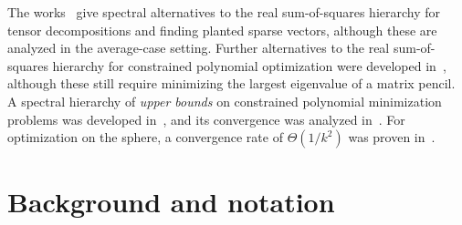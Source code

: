 \documentclass[11pt]{article}
\numberwithin{theorem}{section}
\theoremstyle{definition}
\newcommand{\ip}[2]{\langle #1 , #2\rangle}
\newcommand{\I}{\mathds{1}}
\newcommand{\complex}{\mathbb{C}}
\newcommand{\field}{\mathbb{F}}
\newcommand{\real}{\mathbb{R}}
\newcommand\V{\mathcal{V}}
\newcommand{\Vc}{\V_{\complex}}
\newcommand{\Vr}{\V_{\real}}
\begin{document}
The works~\cite{HopkinsSSS16,schramm2017fast} give spectral alternatives to the real sum-of-squares hierarchy for tensor decompositions and finding planted sparse vectors, although these are analyzed in the average-case setting. Further alternatives to the real sum-of-squares hierarchy for constrained polynomial optimization were developed in~\cite{helmberg2000spectral,mai2022exploiting},
although these still require minimizing the largest eigenvalue of a matrix pencil. A spectral hierarchy of \textit{upper bounds} on constrained polynomial minimization problems was developed in~\cite{lasserre2011new}, and its convergence was analyzed in~\cite{de2017convergence,de2022convergence}. For optimization on the sphere, a convergence rate of $\Theta(1/k^2)$ was proven in~\cite{de2022convergence}.


%
%
%
%
%
%
%
%
%


\section{Background and notation}\label{background}

\end{document}
